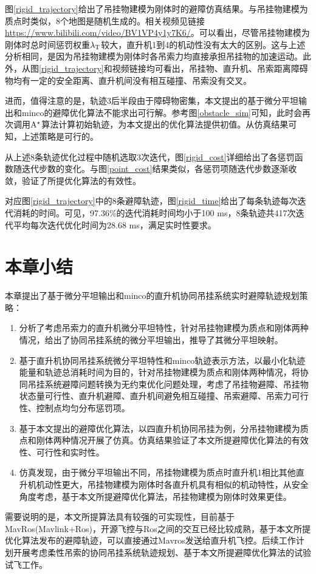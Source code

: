图\ref{rigid_trajectory}给出了吊挂物建模为刚体时的避障仿真结果。与吊挂物建模为质点时类似，8个地图是随机生成的。相关视频见链接\href{https://www.bilibili.com/video/BV1VP4y1y7K6/}{https://www.bilibili.com/video/BV1VP4y1y7K6/}。可以看出，尽管吊挂物建模为刚体时总时间惩罚权重$\lambda_{\rm{T}}$较大，直升机1到4的机动性没有太大的区别。这与上述分析相同，是因为吊挂物建模为刚体时各吊索力均直接承担吊挂物的加速运动。此外，从图\ref{rigid_trajectory}和视频链接均可看出，吊挂物、直升机、吊索距离障碍物均有一定的安全距离、直升机间没有相互碰撞、吊索没有交叉。

进而，值得注意的是，轨迹3后半段由于障碍物密集，本文提出的基于微分平坦输出和minco的避障优化算法不能求出可行解。参考图\ref{obstacle_sim}可知，此时会再次调用$\rm{A}^\star$算法计算初始轨迹，为本文提出的优化算法提供初值。从仿真结果可知，上述策略是可行的。

从上述8条轨迹优化过程中随机选取3次迭代，图\ref{rigid_cost}详细给出了各惩罚函数随迭代步数的变化。与图\ref{point_cost}结果类似，各惩罚项随迭代步数逐渐收敛，验证了所提优化算法的有效性。

对应图\ref{rigid_trajectory}中的8条避障轨迹，图\ref{rigid_time}给出了每条轨迹每次迭代消耗的时间。可见，97.36\%的迭代消耗时间均小于100 ms，8条轨迹共417次迭代平均每次迭代优化时间为28.68 ms，满足实时性要求。

\section{本章小结}\label{Section6:conclusion}
本章提出了基于微分平坦输出和minco的直升机协同吊挂系统实时避障轨迹规划策略：
\begin{enumerate}
    \item 分析了考虑吊索力的直升机微分平坦特性，针对吊挂物建模为质点和刚体两种情况，给出了协同吊挂系统的微分平坦输出，推导了其微分平坦映射。
    \item 基于直升机协同吊挂系统微分平坦特性和minco轨迹表示方法，以最小化轨迹能量和轨迹总消耗时间为目的，针对吊挂物建模为质点和刚体两种情况，将协同吊挂系统避障问题转换为无约束优化问题处理，考虑了吊挂物避障、吊挂物状态量可行性、直升机避障、直升机间避免相互碰撞、吊索避障、吊索力可行性、控制点均匀分布惩罚项。
    \item 基于本文提出的避障优化算法，以四直升机协同吊挂为例，分吊挂物建模为质点和刚体两种情况开展了仿真。仿真结果验证了本文所提避障优化算法的有效性、可行性和实时性。
    \item 仿真发现，由于微分平坦输出不同，吊挂物建模为质点时直升机1相比其他直升机机动性更大，吊挂物建模为刚体时各直升机具有相似的机动特性，从安全角度考虑，基于本文所提避障优化算法，吊挂物建模为刚体时效果更佳。
\end{enumerate}

需要说明的是，本文所提算法具有较强的可实现性，目前基于MavRos(Mavlink+Ros)，开源飞控与Ros之间的交互已经比较成熟，基于本文所提优化算法发布的避障轨迹，可以直接通过Mavros发送给直升机飞控。后续工作计划开展考虑柔性吊索的协同吊挂系统轨迹规划、基于本文所提避障优化算法的试验试飞工作。
